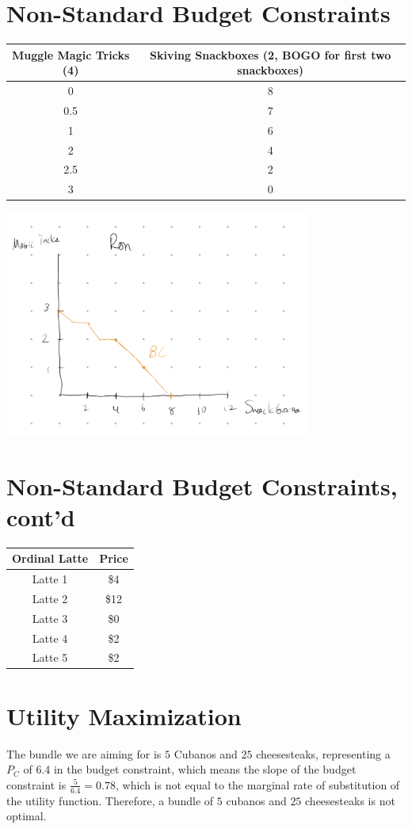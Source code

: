 \documentclass[8pt]{extarticle}
\begin{document}
{\section{Non-Standard Budget Constraints}
\begin{center}
	\begin{tabular}{c|c}
		Muggle Magic Tricks (4) & Skiving Snackboxes (2, BOGO for first two snackboxes)\\
		\hline
		0 & 8 \\
		0.5 & 7\\
		1 & 6 \\
		2 & 4 \\
		2.5 & 2 \\
		3 & 0
	\end{tabular}
\end{center}
\begin{center}
	\includegraphics[width=10cm]{HW3Q7}
\end{center}
\section{Non-Standard Budget Constraints, cont'd}
\begin{center}
	\begin{tabular} {c|c}
		Ordinal Latte & Price \\
		\hline
		Latte 1 & \$4\\
		Latte 2 & \$12 \\
		Latte 3 & \$0 \\
		Latte 4 & \$2 \\
		Latte 5 & \$2
	\end{tabular}
\end{center}
\section{Utility Maximization}
The bundle we are aiming for is $5$ Cubanos and $25$ cheesesteaks, representing a $P_C$ of 6.4 in the budget constraint, which means the slope of the budget constraint is $\frac{5}{6.4} = 0.78$, which is not equal to the marginal rate of substitution of the utility function. Therefore, a bundle of $5$ cubanos and $25$ cheesesteaks is not optimal.
}
\end{document}
